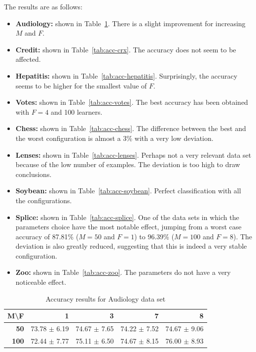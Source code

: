 \documentclass[journal, a4paper]{IEEEtran}
\begin{document}
The results are as follows:
\begin{itemize}
	\item \textbf{Audiology:} shown in Table~\ref{tab:acc-audiology}. There is a
	slight improvement for increasing $ M $ and $ F $.
	\item \textbf{Credit:} shown in Table~\ref{tab:acc-crx}. The accuracy does not
	seem to be affected.
	\item \textbf{Hepatitis:} shown in Table~\ref{tab:acc-hepatitis}. Surprisingly,
	the accuracy seems to be higher for the smallest value of $ F $.
	\item \textbf{Votes:} shown in Table~\ref{tab:acc-votes}. The best accuracy
	has been obtained with $ F = 4 $ and 100 learners.
	\item \textbf{Chess:} shown in Table~\ref{tab:acc-chess}. The difference between
	the best and the worst configuration is almost a 3\% with a very low
	deviation.
	\item \textbf{Lenses:} shown in Table~\ref{tab:acc-lenses}. Perhaps not a very
	relevant data set because of the low number of examples. The deviation is too
	high to draw conclusions.
	\item \textbf{Soybean:} shown in Table~\ref{tab:acc-soybean}. Perfect
	classification with all the configurations.
	\item \textbf{Splice:} shown in Table~\ref{tab:acc-splice}. One of the data
	sets in which the parameters choice have the most notable effect, jumping
	from a worst case accuracy of 87.81\% ($ M = 50 $ and $ F = 1 $) to
	96.39\% ($ M = 100 $ and $ F = 8 $). The deviation is also greatly
	reduced, suggesting that this is indeed a very stable configuration.
	\item \textbf{Zoo:} shown in Table~\ref{tab:acc-zoo}. The parameters do not
	have a very noticeable effect.
\end{itemize}

\begin{table}[htbp]
\caption{Accuracy results for Audiology data set}
\begin{center}
\begin{tabular}{|r|r|r|r|r|}
\hline
\textbf{M\textbackslash{}F} & \textbf{1} & \textbf{3} & \textbf{7} & \textbf{8} \\ \hline
\textbf{50} & 73.78 $ \pm $ 6.19 & 74.67 $ \pm $ 7.65 & 74.22 $ \pm $ 7.52 & 74.67 $ \pm $ 9.06 \\ \hline
\textbf{100} & 72.44 $ \pm $ 7.77 & 75.11 $ \pm $ 6.50 & 74.67 $ \pm $ 8.15 & 76.00 $ \pm $ 8.93 \\ \hline
\end{tabular}
\end{center}
\label{tab:acc-audiology}
\end{table}
\end{document}
